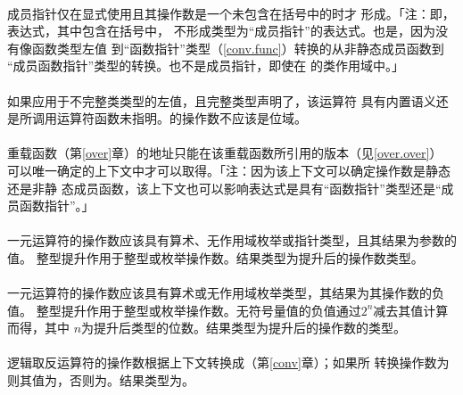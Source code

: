 \paragraph{}
成员指针仅在显式使用\tm{\&}且其操作数是一个未包含在括号中的时才
形成。「注：即，表达式，其中包含在括号中，
不形成类型为``成员指针''的表达式。也是，因为没有像函数类型左值
到``函数指针''类型（\ref{conv.func}）转换的从非静态成员函数到
``成员函数指针''类型的转换。也不是成员指针，即使在
的类作用域中。」

\paragraph{}
如果\tm{\&}应用于不完整类类型的左值，且完整类型声明了，该运算符
具有内置语义还是所调用运算符函数未指明。\tm{\&}的操作数不应该是位域。

\paragraph{}
重载函数（第\ref{over}章）的地址只能在该重载函数所引用的版本（见\ref{over.over}）
可以唯一确定的上下文中才可以取得。「注：因为该上下文可以确定操作数是静态还是非静
态成员函数，该上下文也可以影响表达式是具有``函数指针''类型还是``成员函数指针''。」

\paragraph{}
一元\tm{+}运算符的操作数应该具有算术、无作用域枚举或指针类型，且其结果为参数的值。
整型提升作用于整型或枚举操作数。结果类型为提升后的操作数类型。

\paragraph{}
一元\tm{-}运算符的操作数应该具有算术或无作用域枚举类型，其结果为其操作数的负值。
整型提升作用于整型或枚举操作数。无符号量值的负值通过$2^n$减去其值计算而得，其中
$n$为提升后类型的位数。结果类型为提升后的操作数的类型。

\paragraph{}
逻辑取反运算符\tm{!}的操作数根据上下文转换成（第\ref{conv}章）；如果所
转换操作数为则其值为，否则为。结果类型为。

